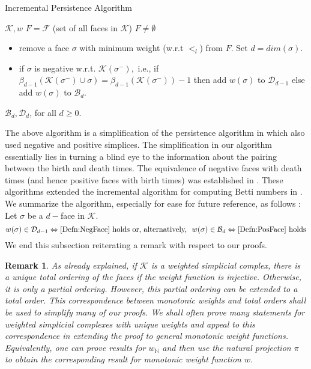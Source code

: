\documentclass[12pt]{amsart}
\newcommand{\gt}[1]{\textcolor{blue}{#1}}
\renewcommand{\gt}[1]{#1}
\newtheorem{remark}[theorem]{Remark}
\numberwithin{equation}{section}
\numberwithin{theorem}{section}
\newcommand{\discrete}{\mathbb{N}}
\newcommand{\1}{\mathbf{1}}
\def\F{\mathcal{F}}
\def\K{\mathcal{K}}
\begin{document}
\begin{algorithm}[ht!]
\caption{Incremental Persistence Algorithm}
\label{alg:incremental}
\begin{algorithmic}
 $\K, w$
\STATE  $F = \F$ (set of all faces in $\K$)
 $F \neq \emptyset$
\begin{itemize}
\item remove a face $\sigma$ with minimum weight (w.r.t $<_l$) from $F$. Set $d = dim (\sigma)$.
\item if $\sigma$ is negative w.r.t. $\K(\sigma^-) ,$ i.e., if $\beta_{d-1}(\K(\sigma^-) \cup \sigma) = \beta_{d-1}(\K(\sigma^-)) - 1$ then add $w(\sigma)$ to $\mathcal{D}_{d-1}$ else add $w(\sigma)$ to $\mathcal{B}_d$.
\end{itemize}
 $\mathcal{B}_d, \mathcal{D}_d$, for all $d \geq 0$.
\end{algorithmic}
\end{algorithm}
%	
The above algorithm is a simplification of the persistence algorithm in \cite[Fig. 5]{edelsbrunner2002topological} which also used negative and positive simplices. The simplification in our algorithm essentially lies in turning a blind eye to the information about the pairing between the birth and death times. The equivalence of negative faces with death times (and hence positive faces with birth times) was established in \cite[Fig. 9]{zomorodian2005computing}. These algorithms extended the incremental algorithm for computing Betti numbers in \cite{delfinado1993incremental}. We summarize the algorithm, especially for ease for future reference, as follows : Let $\sigma$ be a $d-$face in $\K$.
%
\begin{equation}
\label{eqn:death_birth_neg_pos}
w(\sigma) \in \mathcal{D}_{d-1} \Leftrightarrow \mbox{$\eqref{Defn:NegFace}$ holds or, \gt{alternatively,}
%
} \, \,  w(\sigma) \in \mathcal{B}_d \Leftrightarrow \mbox{$\eqref{Defn:PosFace}$ holds}
\end{equation}	
%	
We end this subsection reiterating a remark with respect to our proofs.
%	
\begin{remark}
\label{rem:uniqueness}
As already explained, if $\K$ is a weighted simplicial complex, there is a unique total ordering of the faces if the weight function is injective. Otherwise, it is only a partial ordering. However, this partial ordering can be extended to a total order. This correspondence between monotonic weights and total orders shall be used to simplify many of our proofs. We shall often prove many statements for weighted simplicial complexes with unique weights and appeal to this correspondence in extending the proof to general monotonic weight functions. Equivalently, one can prove results for $w_\discrete$ and then use the natural projection $\pi$ to obtain the corresponding result for monotonic weight function $w$.
\end{remark}
\end{document}
